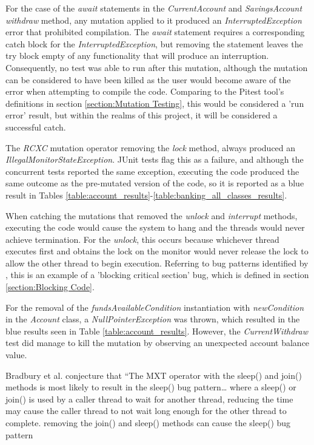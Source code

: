 \documentclass[a4paper,12pt]{article}
\begin{document}
For the case of the \textit{await} statements in the \textit{CurrentAccount} and \textit{SavingsAccount withdraw} method, any mutation applied to it produced an \textit{InterruptedException} error that prohibited compilation. The \textit{await} statement requires a corresponding catch block for the \textit{InterruptedException}, but removing the statement leaves the try block empty of any functionality that will produce an interruption. Consequently, no test was able to run after this mutation, although the mutation can be considered to have been killed as the user would become aware of the error when attempting to compile the code. Comparing to the Pitest tool's definitions in section \ref{section:Mutation Testing}, this would be considered a 'run error' result, but within the realms of this project, it will be considered a successful catch. 

The \textit{RCXC} mutation operator removing the \textit{lock} method, always produced an \textit{IllegalMonitorStateException}. JUnit tests flag this as a failure, and although the concurrent tests reported the same exception, executing the code produced the same outcome as the pre-mutated version of the code, so it is reported as a blue result in Tables \ref{table:account_results}-\ref{table:banking_all_classes_results}.

When catching the mutations that removed the \textit{unlock} and \textit{interrupt} methods, executing the code would cause the system to hang and the threads would never achieve termination. For the \textit{unlock}, this occurs because whichever thread executes first and obtains the lock on the monitor would never release the lock to allow the other thread to begin execution. Referring to bug patterns identified by \citet{bradbury06}, this is an example of a 'blocking critical section' bug, which is defined in section \ref{section:Blocking Code}.     

For the removal of the \textit{fundsAvailableCondition} instantiation with \textit{newCondition} in the \textit{Account} class, a \textit{NullPointerException} was thrown, which resulted in the blue results seen in Table \ref{table:account_results}. However, the \textit{CurrentWithdraw} test did manage to kill the mutation by observing an unexpected account balance value.  


Bradbury et al. conjecture that “The MXT operator with the sleep() and join() methods is most likely to result in the sleep() bug pattern… where a sleep() or join() is used by a caller thread to wait for another thread, reducing the time may cause the caller thread to not wait long enough for the other thread to complete. removing the join() and sleep() methods can cause the sleep() bug pattern 
\end{document}
